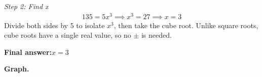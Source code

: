 \documentclass[11pt]{article}
\begin{document}
\textit{Step 2: Find x}
\[\begin{gathered}
135 = 5x^3 \implies x^3 = 27 \implies x = 3
\end{gathered}\]
Divide both sides by 5 to isolate \( x^3 \), then take the cube root. Unlike square roots, cube roots have a single real value, so no \( \pm \) is needed.

\begin{answerbox}
\textbf{Final answer:}\quad \(\displaystyle x = 3\)
\end{answerbox}
\textbf{Graph.}

\begin{center}
\end{center}
\end{document}
